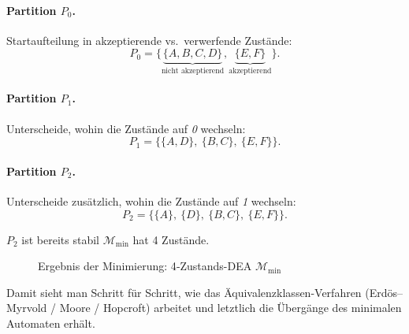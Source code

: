 \paragraph{Partition \(P_0\).}
Startaufteilung in akzeptierende vs.\ verwerfende Zustände:
\[
P_0=\bigl\{\underbrace{\{A,B,C,D\}}_{\text{nicht akzeptierend}}, 
          \underbrace{\{E,F\}}_{\text{akzeptierend}}\bigr\}.
\]

\paragraph{Partition \(P_1\).}
Unterscheide, wohin die Zustände auf \emph{0} wechseln:
\[
P_1=\bigl\{\{A,D\},\ \{B,C\},\ \{E,F\}\bigr\}.
\]

\paragraph{Partition \(P_2\).}
Unterscheide zusätzlich, wohin die Zustände auf \emph{1} wechseln:
\[
P_2=\bigl\{\{A\},\ \{D\},\ \{B,C\},\ \{E,F\}\bigr\}.
\]

\(P_2\) ist bereits stabil \Rightarrow \(\mathcal{M}_{\text{min}}\) hat 4 Zustände.

\begin{figure}[h]
\centering
{}
\caption{Ergebnis der Minimierung: 4‐Zustands-DEA \(\mathcal{M}_{\text{min}}\)}
\end{figure}

\medskip
\noindent
Damit sieht man Schritt für Schritt, wie das Äquivalenz­klassen-Verfahren 
(Erdös–Myrvold / Moore / Hopcroft) arbeitet und letztlich die Übergänge des 
minimalen Automaten erhält.


